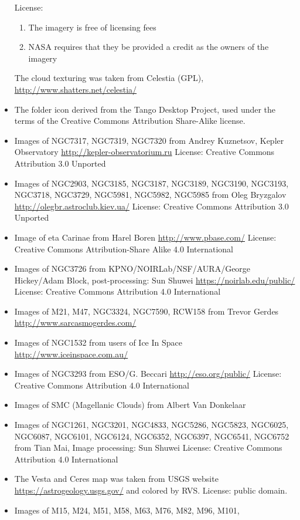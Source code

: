 \begin{itemize}
	 License: \begin{enumerate}
	 		\item The imagery is free of licensing fees
			\item NASA requires that they be provided a credit as the 
		 			owners of the imagery
		 \end{enumerate}
	 The cloud texturing was taken from Celestia (GPL),
	 \url{http://www.shatters.net/celestia/}
\item The folder icon derived from the Tango Desktop Project, used under
	 the terms of the Creative Commons Attribution Share-Alike
	 license.
\item Images of NGC7317, NGC7319, NGC7320
	 from Andrey Kuznetsov, Kepler Observatory
	 \url{http://kepler-observatorium.ru}
	 License: Creative Commons Attribution 3.0 Unported
\item Images of NGC2903, NGC3185, NGC3187, NGC3189,
	 NGC3190, NGC3193, NGC3718, NGC3729, NGC5981, NGC5982,
	 NGC5985
	 from Oleg Bryzgalov 
	 \url{http://olegbr.astroclub.kiev.ua/}
	 License: Creative Commons Attribution 3.0 Unported
\item Image of eta Carinae 
	 from Harel Boren
	 \url{http://www.pbase.com/}
	 License: Creative Commons Attribution-Share Alike 4.0 International
\item Images of NGC3726
	 from KPNO/NOIRLab/NSF/AURA/George Hickey/Adam Block, post-processing: Sun Shuwei
	 \url{https://noirlab.edu/public/}
	 License: Creative Commons Attribution 4.0 International
\item Images of M21, M47, NGC3324, NGC7590, RCW158
	 from Trevor Gerdes
	 \url{http://www.sarcasmogerdes.com/}
\item Images of NGC1532
	 from users of Ice In Space
	 \url{http://www.iceinspace.com.au/}
\item Images of NGC3293
	 from ESO/G. Beccari
	 \url{http://eso.org/public/}
	 License: Creative Commons Attribution 4.0 International
\item Images of SMC (Magellanic Clouds) from Albert Van
	 Donkelaar
\item Images of NGC1261, NGC3201, NGC4833, NGC5286, NGC5823, NGC6025, NGC6087,
	 NGC6101, NGC6124, NGC6352, NGC6397, NGC6541, NGC6752
	 from Tian Mai, Image processing: Sun Shuwei
	 License: Creative Commons Attribution 4.0 International
\item The Vesta and Ceres map was taken from USGS website
	 \url{https://astrogeology.usgs.gov/}
	 and colored by RVS. License: public domain.
\item Images of M15, M24, M51, M58, M63, M76, M82, M96, M101,

\end{itemize}
